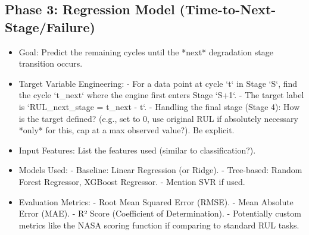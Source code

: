 
\subsection{Phase 3: Regression Model (Time-to-Next-Stage/Failure)}
\label{subsec:regression}
\begin{itemize}
    \item Goal: Predict the remaining cycles until the *next* degradation stage transition occurs.
    \item Target Variable Engineering:
        - For a data point at cycle `t` in Stage `S`, find the cycle `t_next` where the engine first enters Stage `S+1`.
        - The target label is `RUL_next_stage = t_next - t`.
        - Handling the final stage (Stage 4): How is the target defined? (e.g., set to 0, use original RUL if absolutely necessary *only* for this, cap at a max observed value?). Be explicit.
    \item Input Features: List the features used (similar to classification?).
    \item Models Used:
        - Baseline: Linear Regression (or Ridge).
        - Tree-based: Random Forest Regressor, XGBoost Regressor.
        - Mention SVR if used.
    \item Evaluation Metrics:
        - Root Mean Squared Error (RMSE).
        - Mean Absolute Error (MAE).
        - R² Score (Coefficient of Determination).
        - Potentially custom metrics like the NASA scoring function if comparing to standard RUL tasks.
\end{itemize}

